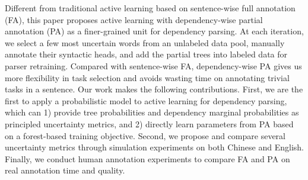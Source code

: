 Different from traditional active learning based on sentence-wise full annotation (FA), this paper proposes active learning with dependency-wise partial annotation (PA) as a finer-grained unit for dependency parsing. At each iteration, we select a few most uncertain words from an unlabeled data pool, manually annotate their syntactic heads, and add the partial trees into labeled data for parser retraining. Compared with sentence-wise FA, dependency-wise PA gives us more flexibility in task selection and avoids wasting time on annotating trivial tasks in a sentence. Our work  makes the following contributions. First, we are the first to apply a probabilistic model to active learning for dependency parsing, which can 1) provide tree probabilities and dependency marginal probabilities as principled uncertainty metrics, and 2) directly learn parameters from PA based on a forest-based training objective. Second, we propose and compare several uncertainty metrics through simulation experiments on both Chinese and English. Finally, we conduct human annotation experiments to compare FA and PA on real annotation time and quality.
